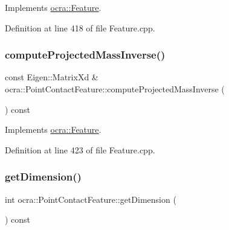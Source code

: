 Implements \hyperlink{classocra_1_1Feature_ac529096b3fe8eba1ab88a56d8b042d37}{ocra\+::\+Feature}.



Definition at line 418 of file Feature.\+cpp.

\hypertarget{classocra_1_1PointContactFeature_abb683382f022909cc02396e50be9328f}{}\label{classocra_1_1PointContactFeature_abb683382f022909cc02396e50be9328f} 
\subsubsection{\texorpdfstring{compute\+Projected\+Mass\+Inverse()}{computeProjectedMassInverse()}\hspace{0.1cm}{\footnotesize\ttfamily [2/2]}}
{\footnotesize\ttfamily const Eigen\+::\+Matrix\+Xd \& ocra\+::\+Point\+Contact\+Feature\+::compute\+Projected\+Mass\+Inverse (\begin{DoxyParamCaption}{ }\end{DoxyParamCaption}) const\hspace{0.3cm}{\ttfamily [virtual]}}



Implements \hyperlink{classocra_1_1Feature_ac27bcbdbb8541e3b4e2c77a6d6f2ffc0}{ocra\+::\+Feature}.



Definition at line 423 of file Feature.\+cpp.

\hypertarget{classocra_1_1PointContactFeature_aa2621ee588c9b593a68ace1a167d4418}{}\label{classocra_1_1PointContactFeature_aa2621ee588c9b593a68ace1a167d4418} 
\subsubsection{\texorpdfstring{get\+Dimension()}{getDimension()}}
{\footnotesize\ttfamily int ocra\+::\+Point\+Contact\+Feature\+::get\+Dimension (\begin{DoxyParamCaption}{ }\end{DoxyParamCaption}) const\hspace{0.3cm}{\ttfamily [virtual]}}



